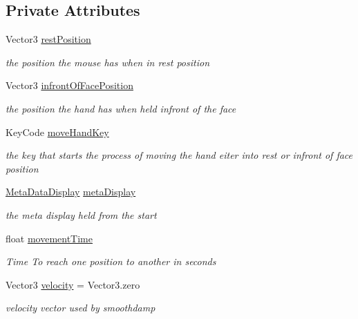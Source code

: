 \subsection*{Private Attributes}
\begin{DoxyCompactItemize}
\item 
Vector3 \mbox{\hyperlink{class_p_c_player_hand_a67a82329e791c5fce99188ba601e229d}{rest\+Position}}
\begin{DoxyCompactList}\small\item\em the position the mouse has when in rest position \end{DoxyCompactList}\item 
Vector3 \mbox{\hyperlink{class_p_c_player_hand_a25ff91db9893158f5185b4826d563e60}{infront\+Of\+Face\+Position}}
\begin{DoxyCompactList}\small\item\em the position the hand has when held infront of the face \end{DoxyCompactList}\item 
Key\+Code \mbox{\hyperlink{class_p_c_player_hand_a3f0649f12dc9268301b87757fab97873}{move\+Hand\+Key}}
\begin{DoxyCompactList}\small\item\em the key that starts the process of moving the hand eiter into rest or infront of face position \end{DoxyCompactList}\item 
\mbox{\hyperlink{class_meta_data_display}{Meta\+Data\+Display}} \mbox{\hyperlink{class_p_c_player_hand_a132e4dc18579e0b2b561857fafaca912}{meta\+Display}}
\begin{DoxyCompactList}\small\item\em the meta display held from the start \end{DoxyCompactList}\item 
float \mbox{\hyperlink{class_p_c_player_hand_aaa5dc972ddaedd270c6f4c19a4c4f61b}{movement\+Time}}
\begin{DoxyCompactList}\small\item\em Time To reach one position to another in seconds \end{DoxyCompactList}\item 
Vector3 \mbox{\hyperlink{class_p_c_player_hand_a15c7717a137aa7790c06f2bdf9b247a1}{velocity}} = Vector3.\+zero
\begin{DoxyCompactList}\small\item\em velocity vector used by smoothdamp \end{DoxyCompactList}\end{DoxyCompactItemize}
